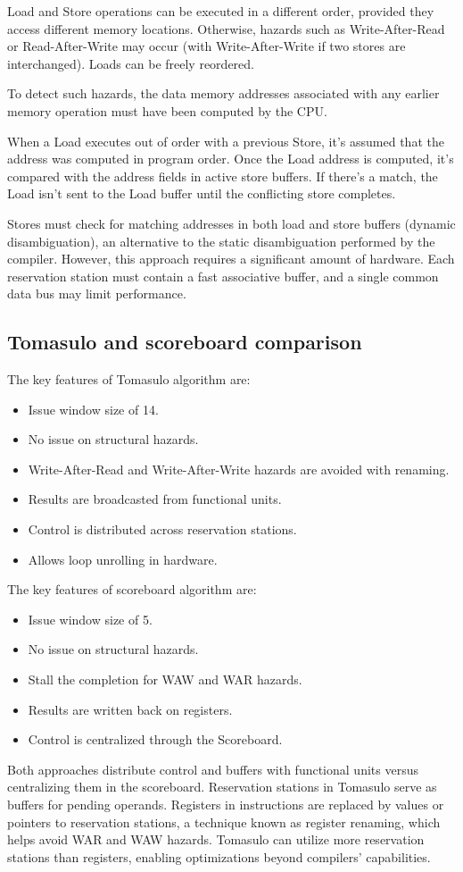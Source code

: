 Load and Store operations can be executed in a different order, provided they access different memory locations. 
Otherwise, hazards such as Write-After-Read or Read-After-Write may occur (with Write-After-Write if two stores are interchanged). 
Loads can be freely reordered.

To detect such hazards, the data memory addresses associated with any earlier memory operation must have been computed by the CPU. 

When a Load executes out of order with a previous Store, it's assumed that the address was computed in program order. 
Once the Load address is computed, it's compared with the address fields in active store buffers. 
If there's a match, the Load isn't sent to the Load buffer until the conflicting store completes.

Stores must check for matching addresses in both load and store buffers (dynamic disambiguation), an alternative to the static disambiguation performed by the compiler. 
However, this approach requires a significant amount of hardware. 
Each reservation station must contain a fast associative buffer, and a single common data bus may limit performance.

\subsection{Tomasulo and scoreboard comparison}
The key features of Tomasulo algorithm are: 
\begin{itemize}
    \item Issue window size of 14.
    \item No issue on structural hazards.
    \item Write-After-Read and Write-After-Write hazards are avoided with renaming.
    \item Results are broadcasted from functional units.
    \item Control is distributed across reservation stations.
    \item Allows loop unrolling in hardware.
\end{itemize}
The key features of scoreboard algorithm are: 
\begin{itemize}
    \item Issue window size of 5.
    \item No issue on structural hazards.
    \item Stall the completion for WAW and WAR hazards.
    \item Results are written back on registers.
    \item Control is centralized through the Scoreboard.
\end{itemize}
Both approaches distribute control and buffers with functional units versus centralizing them in the scoreboard. 
Reservation stations in Tomasulo serve as buffers for pending operands. 
Registers in instructions are replaced by values or pointers to reservation stations, a technique known as register renaming, which helps avoid WAR and WAW hazards. 
Tomasulo can utilize more reservation stations than registers, enabling optimizations beyond compilers' capabilities.

